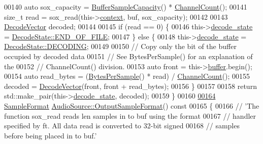 \begin{DoxyCode}
00140     \textcolor{keyword}{auto} sox\_capacity = \hyperlink{classAudioSource_af63c7249c1cf8d4ef86274ea2fdc1f26}{BufferSampleCapacity}() * 
      \hyperlink{classAudioSource_a267178b39a3a4d2fc86f41f6a96caf03}{ChannelCount}();
00141     \textcolor{keywordtype}{size\_t} read = sox\_read(this->\hyperlink{classAudioSource_a2bbce89d4bef9cf46b1113de3245655a}{context}, buf, sox\_capacity);
00142 
00143     \hyperlink{classAudioSource_a836c61e348dbe7df6ba255669c015303}{DecodeVector} decoded;
00144 
00145     \textcolor{keywordflow}{if} (read == 0) \{
00146         this->\hyperlink{classAudioSource_abe3899ebe685335a84c5bfee5a20a96f}{decode\_state} = \hyperlink{classAudioSource_a9a2f5de44325c84e69a7af1331aa159da581953f6b20ad7f993b64b1dc632032e}{DecodeState::END\_OF\_FILE};
00147     \} \textcolor{keywordflow}{else} \{
00148         this->\hyperlink{classAudioSource_abe3899ebe685335a84c5bfee5a20a96f}{decode\_state} = \hyperlink{classAudioSource_a9a2f5de44325c84e69a7af1331aa159da9b75f3acd3c3480965b0f5ee466e7f25}{DecodeState::DECODING};
00149 
00150         \textcolor{comment}{// Copy only the bit of the buffer occupied by decoded data}
00151         \textcolor{comment}{// See BytesPerSample() for an explanation of the}
00152         \textcolor{comment}{// ChannelCount() division.}
00153         \textcolor{keyword}{auto} front = this->\hyperlink{classAudioSource_ad278f3b315e3ad91add683d5eda48a03}{buffer}.begin();
00154         \textcolor{keyword}{auto} read\_bytes = (\hyperlink{classAudioSource_ae6eb4d0fc3d1d60375edc2745b635818}{BytesPerSample}() * read) / \hyperlink{classAudioSource_a267178b39a3a4d2fc86f41f6a96caf03}{ChannelCount}();
00155         decoded = \hyperlink{classAudioSource_a836c61e348dbe7df6ba255669c015303}{DecodeVector}(front, front + read\_bytes);
00156     \}
00157 
00158     \textcolor{keywordflow}{return} std::make\_pair(this->\hyperlink{classAudioSource_abe3899ebe685335a84c5bfee5a20a96f}{decode\_state}, decoded);
00159 \}
00160 
\hypertarget{audio__source_8cpp_source_l00164}{}\hyperlink{classAudioSource_aa6c567c4e2f3c6673d2a289d84aedae0}{00164} \hyperlink{sample__formats_8hpp_a21cca244e782ff3acc8805fb73236772}{SampleFormat} \hyperlink{classAudioSource_aa6c567c4e2f3c6673d2a289d84aedae0}{AudioSource::OutputSampleFormat}()\textcolor{keyword}{ const}
00165 \textcolor{keyword}{}\{
00166     \textcolor{comment}{// 'The function sox\_read reads len samples in to buf using the format}
00167     \textcolor{comment}{// handler specified by ft. All data read is converted to 32-bit signed}
00168     \textcolor{comment}{// samples before being placed in to buf.'}

\end{DoxyCode}
